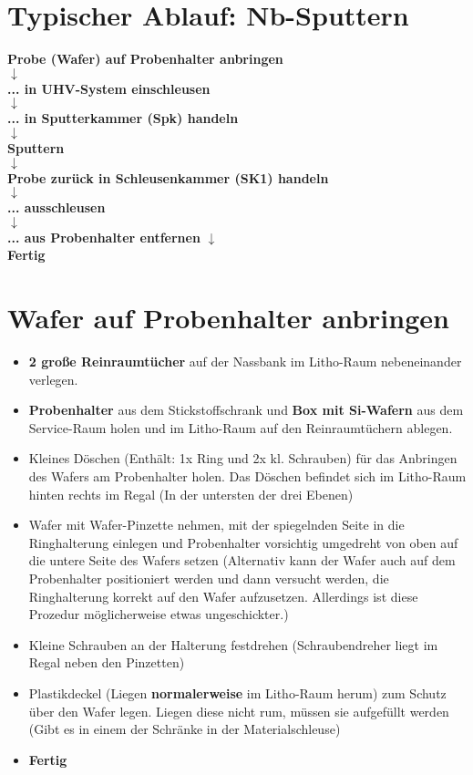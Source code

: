 \documentclass[
  ngerman,
  twoside,
  captions=tableheading,
  BCOR=.5cm,
  fontsize=11,
  ]{scrreprt}
\begin{document}
\tableofcontents

\newpage

\chapter{Typischer Ablauf: Nb-Sputtern}
\begin{center}
\textbf{Probe (Wafer) auf Probenhalter anbringen}\\
$\downarrow$\\
\textbf{... in UHV-System einschleusen}\\
$\downarrow$\\
\textbf{... in Sputterkammer (Spk) handeln}\\
$\downarrow$\\
\textbf{Sputtern}\\
$\downarrow$\\
\textbf{Probe zurück in Schleusenkammer (SK1) handeln}\\
$\downarrow$\\
\textbf{... ausschleusen}\\
$\downarrow$\\
\textbf{... aus Probenhalter entfernen}
$\downarrow$\\
\textbf{Fertig}
\end{center}


\newpage


\chapter{Wafer auf Probenhalter anbringen}
\begin{itemize}
\item \textbf{2 große Reinraumtücher} auf der Nassbank im Litho-Raum nebeneinander verlegen.
\item \textbf{Probenhalter} aus dem Stickstoffschrank und \textbf{Box mit Si-Wafern} aus dem Service-Raum holen und im Litho-Raum auf den Reinraumtüchern ablegen.
\item Kleines Döschen (Enthält: 1x Ring und 2x kl. Schrauben) für das Anbringen des Wafers am Probenhalter holen. Das Döschen befindet sich im Litho-Raum hinten rechts im Regal (In der untersten der drei Ebenen)
\item Wafer mit Wafer-Pinzette nehmen, mit der spiegelnden Seite in die Ringhalterung einlegen und Probenhalter vorsichtig umgedreht von oben auf die untere Seite des Wafers setzen (Alternativ kann der Wafer auch auf dem Probenhalter positioniert werden und dann versucht werden, die Ringhalterung korrekt auf den Wafer aufzusetzen. Allerdings ist diese Prozedur möglicherweise etwas ungeschickter.)
\item Kleine Schrauben an der Halterung festdrehen (Schraubendreher liegt im Regal neben den Pinzetten)
\item Plastikdeckel (Liegen \textbf{normalerweise} im Litho-Raum herum) zum Schutz über den Wafer legen. Liegen diese nicht rum, müssen sie aufgefüllt werden (Gibt es in einem der Schränke in der Materialschleuse)
\item \textbf{Fertig}
\end{itemize}
\end{document}
